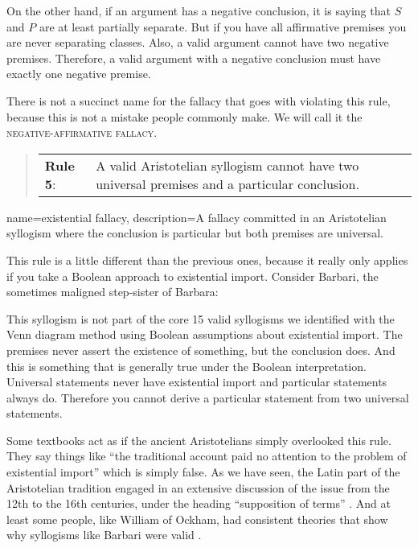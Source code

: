On the other hand, if an argument has a negative conclusion, it is saying that $S$ and $P$ are at least partially separate. But if you have all affirmative premises you are never separating classes. Also, a valid argument cannot have two negative premises. Therefore, a valid argument with a negative conclusion must have exactly one negative premise.

There is not a succinct name for the fallacy that goes with violating this rule, because this is not a mistake people commonly make. We will call it the \textsc{\gls{negative-affirmative fallacy}}. \label{def:negative-affirmative _fallacy}

\begin{quotation}
\begin{tabu}{p{.1\linewidth}p{.9\linewidth}}
\textbf{Rule 5}: & A valid Aristotelian syllogism cannot have two universal premises and a particular conclusion.
\end{tabu} \label{rule_5}
\end{quotation}


{
name=existential fallacy,
description={A fallacy committed in an Aristotelian syllogism where the conclusion is particular but both premises are universal. }
}

This rule is a little different than the previous ones, because it really only applies if you take a Boolean approach to existential import. Consider Barbari, the sometimes maligned step-sister of Barbara:

\begin{kormanize}
\end{kormanize}

This syllogism is not part of the core 15 valid syllogisms we identified with the Venn diagram method using Boolean assumptions about existential import. The premises never assert the existence of something, but the conclusion does. And this is something that is generally true under the Boolean interpretation. Universal statements never have existential import and particular statements always do. Therefore you cannot derive a particular statement from two universal statements.

Some textbooks act as if the ancient Aristotelians simply overlooked this rule. They say things like ``the traditional account paid no attention to the problem of existential import'' which is simply false. As we have seen, the Latin part of the Aristotelian tradition engaged in an extensive discussion of the issue from the 12th to the 16th centuries, under the heading ``supposition of terms'' \cite{Read2002}. And at least some people, like William of Ockham, had consistent theories that show why syllogisms like Barbari were valid \cite{Parsons2008}.

